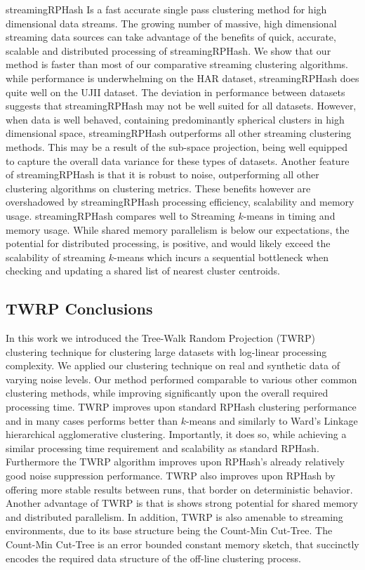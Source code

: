\textsf{streamingRPHash} Is a fast accurate single pass clustering method for high dimensional data
streams.  The growing number of massive, high dimensional streaming data sources can take advantage
of the benefits of quick, accurate, scalable and distributed processing of \textsf{streamingRPHash}.
We show that our method is faster than most of our comparative streaming clustering algorithms. 
while performance is underwhelming on the HAR dataset, \textsf{streamingRPHash} does quite well on
the UJII dataset.  The deviation in performance between datasets suggests that
\textsf{streamingRPHash} may not be well suited for all datasets.  However, when data is well
behaved, containing predominantly spherical clusters in high dimensional space,
\textsf{streamingRPHash} outperforms all other streaming clustering methods.  This may be a result
of the sub-space projection, being well equipped to capture the overall data variance for these types
of datasets.  Another feature of \textsf{streamingRPHash} is that it is robust to noise,
outperforming all other clustering algorithms on clustering metrics.  These benefits however are
overshadowed by \textsf{streamingRPHash} processing efficiency, scalability and memory usage.
\textsf{streamingRPHash} compares well to Streaming $k$-means in timing and memory usage.  While
shared memory parallelism is below our expectations, the potential for distributed processing, is
positive, and would likely exceed the scalability of streaming $k$-means which incurs a sequential
bottleneck when checking and updating a shared list of nearest cluster centroids.

\subsection{TWRP Conclusions}

In this work we introduced the Tree-Walk Random Projection (\textsf{TWRP}) clustering technique for
clustering large datasets with log-linear processing complexity.  We applied our clustering
technique on real and synthetic data of varying noise levels.  Our method performed comparable to
various other common clustering methods, while improving significantly upon the overall required
processing time.  \textsf{TWRP} improves upon standard \textsf{RPHash} clustering performance and in many cases
performs better than $k$-means and similarly to Ward's Linkage hierarchical agglomerative
clustering.  Importantly, it does so, while achieving a similar processing time requirement and
scalability as standard \textsf{RPHash}.  Furthermore the \textsf{TWRP} algorithm improves upon \textsf{RPHash}'s already
relatively good noise suppression performance.  \textsf{TWRP} also improves upon \textsf{RPHash} by offering more
stable results between runs, that border on deterministic behavior.  Another advantage of \textsf{TWRP} is
that is shows strong potential for shared memory and distributed parallelism.  In addition, \textsf{TWRP} is
also amenable to streaming environments, due to its base structure being the Count-Min Cut-Tree.
The Count-Min Cut-Tree is an error bounded constant memory sketch, that succinctly encodes the
required data structure of the off-line clustering process.

